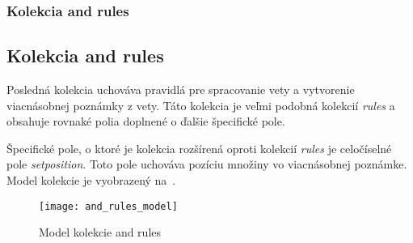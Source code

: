 %
%
{
	\subsubsection{Kolekcia and rules}
}
{
	\subsection{Kolekcia and rules}
}
\label{subsubsection:collection_and_rules}
Posledná kolekcia uchováva pravidlá pre spracovanie vety a vytvorenie viacnásobnej poznámky z vety. Táto kolekcia je veľmi podobná kolekcií \textit{rules} a obsahuje rovnaké polia doplnené o ďalšie špecifické pole.

Špecifické pole, o ktoré je kolekcia rozšírená oproti kolekcií \textit{rules} je celočíselné pole \textit{set\textunderscore position}. Toto pole uchováva pozíciu množiny vo viacnásobnej poznámke. Model kolekcie je vyobrazený na~.

\begin{figure}[H]
	\begin{center}\texttt{[image: and\_rules\_model]}\end{center}
	\caption[Model kolekcie and rules]{Model kolekcie and rules}\label{fig:and_rules_collection_model}
\end{figure}


